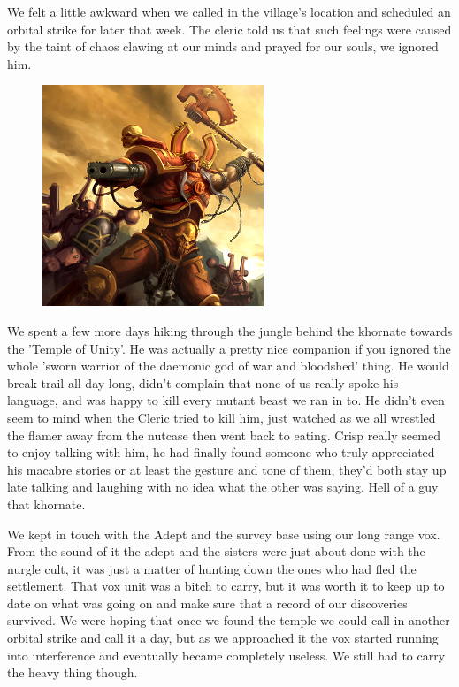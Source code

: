 We felt a little awkward when we called in the village's location and scheduled an orbital strike for later that week. 
The cleric told us that such feelings were caused by the taint of chaos clawing at our minds and prayed for our souls, we ignored him.

\begin{figure}
	\begin{center}
		\includegraphics[width=\figwidth]{pics/6/36.png}
	\end{center}
\end{figure}
We spent a few more days hiking through the jungle behind the khornate towards the 'Temple of Unity'. 
He was actually a pretty nice companion if you ignored the whole 'sworn warrior of the daemonic god of war and bloodshed' thing. 
He would break trail all day long, didn't complain that none of us really spoke his language, and was happy to kill every mutant beast we ran in to. 
He didn't even seem to mind when the Cleric tried to kill him, just watched as we all wrestled the flamer away from the nutcase then went back to eating. 
Crisp really seemed to enjoy talking with him, he had finally found someone who truly appreciated his macabre stories or at least the gesture and tone of them, they'd both stay up late talking and laughing with no idea what the other was saying. 
Hell of a guy that khornate.

We kept in touch with the Adept and the survey base using our long range vox. 
From the sound of it the adept and the sisters were just about done with the nurgle cult, it was just a matter of hunting down the ones who had fled the settlement. 
That vox unit was a bitch to carry, but it was worth it to keep up to date on what was going on and make sure that a record of our discoveries survived. 
We were hoping that once we found the temple we could call in another orbital strike and call it a day, but as we approached it the vox started running into interference and eventually became completely useless. 
We still had to carry the heavy thing though.

